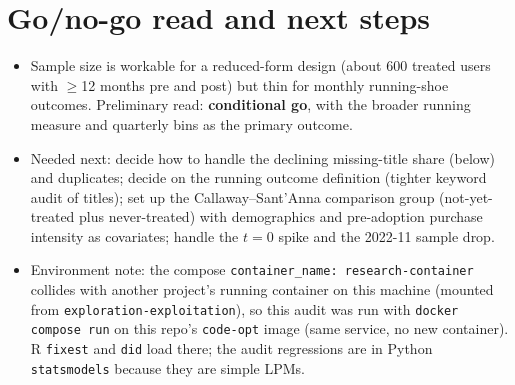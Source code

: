 \documentclass[11pt]{article}
\begin{document}
\section{Go/no-go read and next steps}
\begin{itemize}[nosep]
\item Sample size is workable for a reduced-form design (about 600 treated users with $\geq$12 months pre and post) but thin for monthly running-shoe outcomes. Preliminary read: \textbf{conditional go}, with the broader running measure and quarterly bins as the primary outcome.
\item Needed next: decide how to handle the declining missing-title share (below) and duplicates; decide on the running outcome definition (tighter keyword audit of titles); set up the Callaway--Sant'Anna comparison group (not-yet-treated plus never-treated) with demographics and pre-adoption purchase intensity as covariates; handle the $t=0$ spike and the 2022-11 sample drop.
\item Environment note: the compose \texttt{container\_name: research-container} collides with another project's running container on this machine (mounted from \texttt{exploration-exploitation}), so this audit was run with \texttt{docker compose run} on this repo's \texttt{code-opt} image (same service, no new container). R \texttt{fixest} and \texttt{did} load there; the audit regressions are in Python \texttt{statsmodels} because they are simple LPMs.
\end{itemize}
\end{document}
